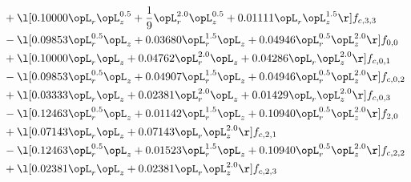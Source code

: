 \begin{alignat}{2}
& + \l[  0.10000 \opL_r \opL_z^{0.5} + \frac{1}{9} \opL_r^{2.0} \opL_z^{0.5} +  0.01111 \opL_r \opL_z^{1.5}  \r] f_{c,3,3} \nonumber \\ 
& - \l[  0.09853 \opL_r^{0.5} \opL_z +  0.03680 \opL_r^{1.5} \opL_z +  0.04946 \opL_r^{0.5} \opL_z^{2.0}  \r] f_{0,0} \nonumber \\ 
& + \l[  0.10000 \opL_r \opL_z +  0.04762 \opL_r^{2.0} \opL_z +  0.04286 \opL_r \opL_z^{2.0}  \r] f_{c,0,1} \nonumber \\ 
& - \l[  0.09853 \opL_r^{0.5} \opL_z +  0.04907 \opL_r^{1.5} \opL_z +  0.04946 \opL_r^{0.5} \opL_z^{2.0}  \r] f_{c,0,2} \nonumber \\ 
& + \l[  0.03333 \opL_r \opL_z +  0.02381 \opL_r^{2.0} \opL_z +  0.01429 \opL_r \opL_z^{2.0}  \r] f_{c,0,3} \nonumber \\ 
& - \l[  0.12463 \opL_r^{0.5} \opL_z +  0.01142 \opL_r^{1.5} \opL_z +  0.10940 \opL_r^{0.5} \opL_z^{2.0}  \r] f_{2,0} \nonumber \\ 
& + \l[  0.07143 \opL_r \opL_z +  0.07143 \opL_r \opL_z^{2.0}  \r] f_{c,2,1} \nonumber \\ 
& - \l[  0.12463 \opL_r^{0.5} \opL_z +  0.01523 \opL_r^{1.5} \opL_z +  0.10940 \opL_r^{0.5} \opL_z^{2.0}  \r] f_{c,2,2} \nonumber \\ 
& + \l[  0.02381 \opL_r \opL_z +  0.02381 \opL_r \opL_z^{2.0}  \r] f_{c,2,3} \nonumber \\ 
\end{alignat} 


